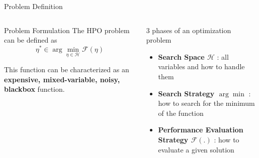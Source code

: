 \begin{frame}{Problem Definition}
   

    \begin{columns}
    
        \begin{column}[t]{0.4\textwidth}
            

            \begin{block}{Problem Formulation}
                The HPO problem can be defined as 
                \begin{equation}
                \eta^* \in \arg\min_{\eta \in \mathcal{H}} \mathcal{F}(\eta) 
                \end{equation}
            \end{block}

            This function can be characterized as an \large\textbf{expensive, mixed-variable, noisy, blackbox} function.
            \end{column}
        
        \begin{column}[t]{0.5\textwidth}
            \begin{block}{3 phases of an optimization problem}
                \begin{itemize}
                    \item \textbf{Search Space $\mathcal{H}$} : all variables and how to handle them
                    \item \textbf{Search Strategy $\arg\min$} : how to search for the minimum of the function
                    \item \textbf{Performance Evaluation Strategy $\mathcal{F}(.)$} : how to evaluate a given solution
                \end{itemize}
            \end{block}

        \end{column}
         
  \end{columns}
\end{frame}


